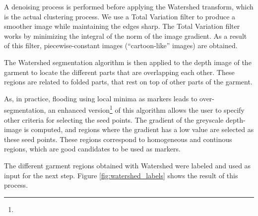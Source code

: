 
A denoising process is performed before applying the Watershed transform, which is the actual clustering process. We use a Total Variation filter \cite{chambolle2004algorithm} to produce a smoother image while maintaining the edges sharp. The Total Variation filter works by minimizing the integral of the norm of the image gradient. As a result of this filter, piecewise-constant images (``cartoon-like'' images) are obtained.

The Watershed segmentation algorithm is then applied to the depth image of the garment to locate the different parts that are overlapping each other. These regions are related to folded parts, that rest on top of other parts of the garment. 

As, in practice, flooding using local minima as markers  leads to over-segmentation, an enhanced version\footnote{} of this algorithm  allows the user to specify other criteria for selecting the seed points. The gradient of the greyscale depth-image is computed, and regions where the gradient has a low value are selected as these seed points. These regions correspond to homogeneous and continous regions, which are good candidates to be used as markers.


The different garment regions obtained with Watershed were labeled and used as input for the next step. Figure \ref{fig:watershed_labels} shows the result of this process.


